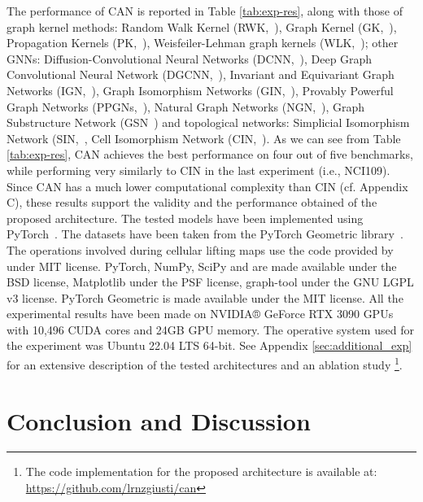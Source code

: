 \documentclass{article}
\begin{document}
The performance of CAN is reported in Table \ref{tab:exp-res}, along with those of graph kernel methods: Random Walk Kernel (RWK,~\cite{gartner2003graph}), 
Graph Kernel (GK,~\cite{shervashidze2009efficient}),
Propagation Kernels (PK,~\cite{neumann2016propagation}), 
Weisfeiler-Lehman graph kernels (WLK,~\cite{shervashidze2011weisfeiler}); other GNNs: Diffusion-Convolutional Neural Networks (DCNN,~\cite{atwood2016diffusion}),  Deep Graph Convolutional Neural Network (DGCNN,~\cite{zhang2018end}), Invariant and Equivariant Graph Networks (IGN,~\cite{maron2018invariant}), Graph Isomorphism Networks (GIN,~\cite{xu2018powerful}), Provably Powerful Graph Networks (PPGNs,~\cite{maron2019provably}), Natural Graph Networks (NGN,~\cite{de2020natural}), Graph Substructure Network (GSN~\cite{bouritsas2022improving}) and topological networks: Simplicial Isomorphism Network (SIN,~\cite{bodnar2021weisfeiler},
Cell Isomorphism Network (CIN,~\cite{bodnarcwnet}). As we can see from Table \ref{tab:exp-res}, CAN achieves the best performance on four out of five benchmarks, while performing very similarly to CIN in the last experiment (i.e., NCI109). Since CAN has a much lower computational complexity than CIN (cf. Appendix C), these results support the validity and the performance obtained of the proposed architecture. The tested  models have been implemented using PyTorch~\cite{pytorch19}. The datasets have been taken from the PyTorch Geometric library~\cite{pyg2019}. The operations involved during cellular lifting maps use the code provided by \cite{bodnarcwnet} under MIT license.
PyTorch, NumPy, SciPy and are made available under the BSD license, Matplotlib under the PSF license, graph-tool under the GNU LGPL v3 license. PyTorch Geometric is made available under the MIT license. All the experimental results have been made on NVIDIA® GeForce RTX 3090 GPUs  with 10,496 CUDA cores and 24GB GPU memory. The operative system used for the experiment was Ubuntu 22.04 LTS 64-bit. See Appendix \ref{sec:additional_exp} for an extensive description of the tested architectures and an ablation study \footnote{The code implementation for the proposed architecture is available at:  \url{https://github.com/lrnzgiusti/can}}. 


\section{Conclusion and Discussion}
\end{document}
